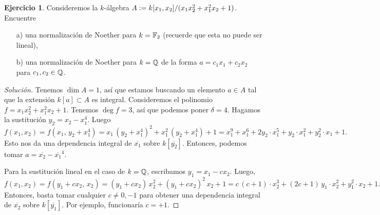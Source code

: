 \documentclass{article}
\theoremstyle{definition}
\newtheorem{ejerc}{Ejercicio}
\newenvironment{solucion}{\begin{proof}[Solución]}{\end{proof}}
\begin{document}
\begin{ejerc}
  Consideremos la $k$-álgebra
  $A \mathrel{\mathop:}= k [x_1,x_2] / (x_1 x_2^2 + x_1^2 x_2 + 1)$. Encuentre

  \begin{enumerate}
  \item[a)] una normalización de Noether para $k = \mathbb{F}_2$
    (recuerde que esta no puede ser lineal),
  \item[b)] una normalización de Noether para $k = \mathbb{Q}$ de la forma
    $a = c_1 x_1 + c_2 x_2$ para $c_1, c_2 \in \mathbb{Q}$.
  \end{enumerate}

  \ifdefined\solutions\begin{solucion}
    Tenemos $\dim A = 1$, así que estamos buscando un elemento $a \in A$ tal que
    la extensión $k [a] \subset A$ es integral. Consideremos el polinomio
    $f = x_1 x_2^2 + x_1^2 x_2 + 1$. Tenemos $\deg f = 3$, así que podemos poner
    $\delta = 4$. Hagamos la sustitución $y_2 = x_2 - x_1^4$. Luego
    \[ f (x_1,x_2) =
       f (x_1, \, y_2 + x_1^4) =
       x_1\,(y_2 + x_1^4)^2 + x_1^2\,(y_2 + x_1^4) + 1 =
       x_1^9 + x_1^6 + 2 y_2\cdot x_1^5 + y_2\cdot x_1^2 + y_2^2\cdot x_1 + 1. \]
    Esto nos da una dependencia integral de $\overline{x_1}$ sobre
    $k [\overline{y_2}]$. Entonces, podemos tomar
    $a = \overline{x_2} - \overline{x_1}^4$.

    Para la sustitución lineal en el caso de $k = \mathbb{Q}$, escribamos
    $y_1 = x_1 - cx_2$. Luego,
    \[ f (x_1,x_2) =
       f (y_1 + cx_2, \, x_2) =
       (y_1 + cx_2)\,x_2^2 + (y_1 + cx_2)^2\,x_2 + 1 =
       c\,(c+1)\cdot x_2^3 + (2c + 1)\,y_1\cdot x_2^2 + y_1^2\cdot x_2 + 1. \]
    Entonces, basta tomar cualquier $c \ne 0, -1$ para obtener una dependencia
    integral de $\overline{x_2}$ sobre $k [\overline{y_1}]$. Por ejemplo,
    funcionaría $c = +1$.
  \end{solucion}\fi
\end{ejerc}
\end{document}
